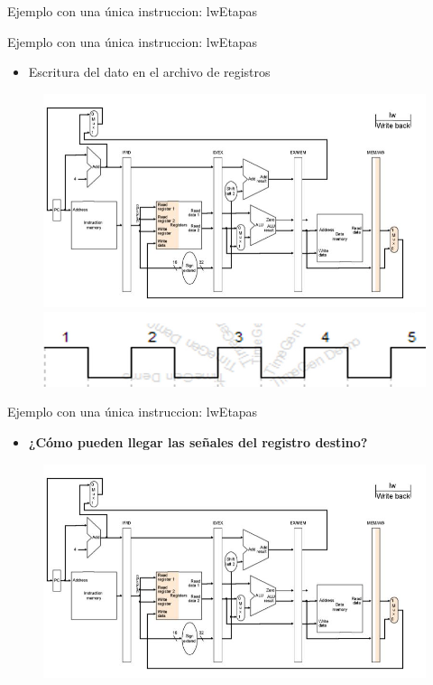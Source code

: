 \documentclass[aspectratio=169,compress]{beamer}
\begin{document}
\begin{footnotesize}
\begin{frame}{Ejemplo con una única instruccion: lw}{Etapas}
\end{frame}







\begin{frame}{Ejemplo con una única instruccion: lw}{Etapas}
\begin{itemize}
\item Escritura del dato en el archivo de registros
\end{itemize}
\begin{figure}
\includegraphics[scale=0.27]{images/lw5.jpg} \\
\includegraphics[scale=0.27]{images/clock2.jpg} 
\end{figure}

\end{frame}



\begin{frame}{Ejemplo con una única instruccion: lw}{Etapas}
\begin{itemize}
\item \textbf{¿Cómo pueden llegar las señales del registro destino?}
\end{itemize}
\begin{figure}
\includegraphics[scale=0.4]{images/lw5.jpg} 
\end{figure}


\end{frame}
\end{footnotesize}
\end{document}
